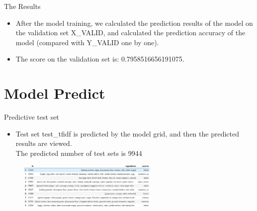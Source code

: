 \documentclass[
 size=14pt,
 paper=smartboard,  %
 mode=present, 		%
 display=slides, 	%
 style=tuliplab,  	%
 pauseslide,
 fleqn,leqno]{powerdot}
\begin{document}
\begin{slide}{The Results}
  \begin{center}
  
    {
      \begin{itemize}
       
        \item 
        After the model training, we calculated the prediction results of the model on the validation set X_VALID, and calculated the prediction accuracy of the model (compared with Y_VALID one by one).\\
        \item 
        The score on the validation set is: 0.7958516656191075.
      \end{itemize}
      }
  
  \end{center}
  \bigskip
\end{slide}
\section{Model Predict}
\begin{slide}{Predictive test set}
  \begin{center}
  
  {
  \begin{itemize}
  \item 
  Test set test_tfidf is predicted by the model grid, and then the predicted results are viewed.\\
  The predicted number of test sets is 9944  
\end{itemize}
  }
  \begin{figure}
    \centering

    \includegraphics[width=0.6\textwidth]{pic01/result.eps} 
    
  \end{figure}   
     
    

  \end{center}
  \bigskip
  \begin{center}
  
  \end{center}
  \bigskip
\end{slide}
\end{document}
